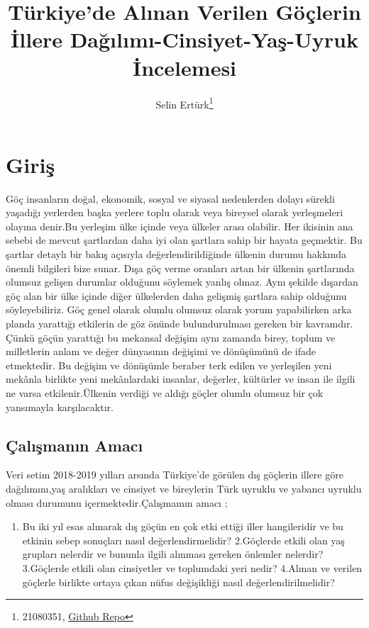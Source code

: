 \documentclass[
  12pt,
]{article}
\title{Türkiye'de Alınan Verilen Göçlerin İllere Dağılımı-Cinsiyet-Yaş-Uyruk İncelemesi}
\author{Selin Ertürk\footnote{21080351, \href{https://github.com/selinerturk/Vize}{Github Repo}}}
\date{}
\providecommand{\tightlist}{%
  \setlength{\itemsep}{0pt}\setlength{\parskip}{0pt}}
\begin{document}
\maketitle

\hypertarget{giriux15f}{%
\section{Giriş}\label{giriux15f}}

Göç insanların doğal, ekonomik, sosyal ve siyasal nedenlerden dolayı sürekli yaşadığı yerlerden başka yerlere toplu olarak veya bireysel olarak yerleşmeleri olayına denir.Bu yerleşim ülke içinde veya ülkeler arası olabilir. Her ikisinin ana sebebi de mevcut şartlardan daha iyi olan şartlara sahip bir hayata geçmektir. Bu şartlar detaylı bir bakış açısıyla değerlendirildiğinde ülkenin durumu hakkında önemli bilgileri bize sunar. Dışa göç verme oranları artan bir ülkenin şartlarında olumsuz gelişen durumlar olduğunu söylemek yanlış olmaz. Aynı şekilde dışardan göç alan bir ülke içinde diğer ülkelerden daha gelişmiş şartlara sahip olduğunu söyleyebiliriz. Göç genel olarak olumlu olumsuz olarak yorum yapabilirken arka planda yarattığı etkilerin de göz önünde bulundurulması gereken bir kavramdır. Çünkü göçün yarattığı bu mekansal değişim aynı zamanda birey, toplum ve milletlerin anlam ve değer dünyasının değişimi ve dönüşümünü de ifade etmektedir. Bu değişim ve dönüşümle beraber terk edilen ve yerleşilen yeni mekânla birlikte yeni mekânlardaki insanlar, değerler, kültürler ve insan ile ilgili ne varsa etkilenir.Ülkenin verdiği ve aldığı göçler olumlu olumsuz bir çok yansımayla karşılacaktır.

\hypertarget{uxe7alux131ux15fmanux131n-amacux131}{%
\subsection{Çalışmanın Amacı}\label{uxe7alux131ux15fmanux131n-amacux131}}

Veri setim 2018-2019 yılları arsında Türkiye'de görülen dış göçlerin illere göre dağılımını,yaş aralıkları ve cinsiyet ve bireylerin Türk uyruklu ve yabancı uyruklu olması durumunu içermektedir.Çalışmamın amacı ;

\begin{enumerate}
\def\labelenumi{\arabic{enumi}.}
\tightlist
\item
  Bu iki yıl esas alınarak dış göçün en çok etki ettiği iller hangileridir ve bu etkinin sebep sonuçları nasıl değerlendirmelidir? 2.Göçlerde etkili olan yaş grupları nelerdir ve bununla ilgili alınması gereken önlemler nelerdir?
  3.Göçlerde etkili olan cinsiyetler ve toplumdaki yeri nedir?
  4.Alınan ve verilen göçlerle birlikte ortaya çıkan nüfus değişikliği nasıl değerlendirilmelidir?
\end{enumerate}
\end{document}

